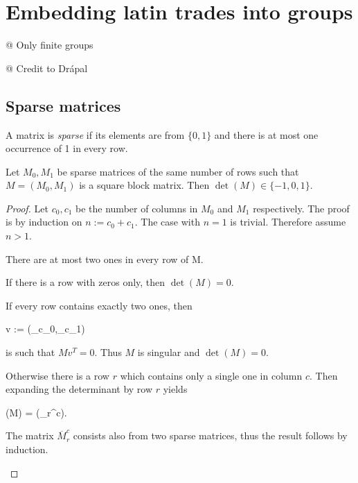 \chapter{Embedding latin trades into groups}
\label{chap:lower-bound}

@ Only finite groups

@ Credit to Drápal

\section{Sparse matrices}

\begin{defn}
A matrix is \emph{sparse} if its elements are from $\{0,1\}$ and there is at most one occurrence of 1 in every row.
\end{defn}

\begin{lem}
\label{lem:sparse2}
Let $M_0,M_1$ be sparse matrices of the same number of rows such that $M = (M_0,M_1)$ is a square block matrix. Then $\det(M) \in \{-1,0,1\}$.
\end{lem}
\begin{proof}
Let $c_0,c_1$ be the number of columns in $M_0$ and $M_1$ respectively. The proof is by induction on $n := c_0+c_1$. The case with $n=1$ is trivial. Therefore assume $n>1$.

There are at most two ones in every row of M.
\begin{cosyitemize}
	\item If there is a row with zeros only, then $\det(M) = 0$.
	\item If every row contains exactly two ones, then
		\begin{cosyeqnarray}
			v := (_{c_0},_{c_1}) \nonumber
		\end{cosyeqnarray}%
		is such that $Mv^T = 0$. Thus $M$ is singular and $\det(M) = 0$.
	\item Otherwise there is a row $r$ which contains only a single one in column $c$. Then expanding the determinant by row $r$ yields
	 \begin{cosyeqnarray}
	 	\det(M) = \pm \det(_r^c).
	 \end{cosyeqnarray}%
	The matrix $\overbar{M}_r^c$ consists also from two sparse matrices, thus the result follows by induction.
\end{cosyitemize}
\end{proof}

